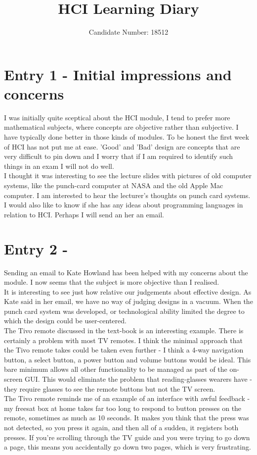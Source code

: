\documentclass{article}
\title{HCI Learning Diary}
\author{Candidate Number: 18512}
\begin{document}
\maketitle
\section*{Entry 1 - Initial impressions and concerns}

\noindent I was initially quite sceptical about the HCI module, I tend to prefer more mathematical subjects, where concepts are objective rather than subjective. I have typically done better in those kinds of modules. To be honest the first week of HCI has not put me at ease. 'Good' and 'Bad' design are concepts that are very difficult to pin down and I worry that if I am required to identify such things in an exam I will not do well.
\\\indent I thought it was interesting to see the lecture slides with pictures of old computer systems, like the punch-card computer at NASA and the old Apple Mac computer. I am interested to hear the lecturer's thoughts on punch card systems. I would also like to know if she has any ideas about programming languages in relation to HCI. Perhaps I will send an her an email.

\section*{Entry 2 - }

\noindent Sending an email to Kate Howland has been helped with my concerns about the module. I now seems that the subject is more objective than I realised.
\\\indent It is interesting to see just how relative our judgements about effective design. As Kate said in her email, we have no way of judging designs in a vacuum. When the punch card system was developed, or technological ability limited the degree to which the design could be user-centered.
\\\indent The Tivo remote discussed in the text-book is an interesting example. There is certainly a problem with most TV remotes. I think the minimal approach that the Tivo remote takes could be taken even further - I think a 4-way navigation button, a select button, a power button and volume buttons would be ideal. This bare minimum allows all other functionality to be managed as part of the on-screen GUI. This would eliminate the problem that reading-glasses wearers have - they require glasses to see the remote buttons but not the TV screen.
\\\indent The Tivo remote reminds me of an example of an interface with awful feedback - my freesat box at home takes far too long to respond to button presses on the remote, sometimes as much as 10 seconds. It makes you think that the press was not detected, so you press it again, and then all of a sudden, it registers both presses. If you're scrolling through the TV guide and you were trying to go down a page, this means you accidentally go down two pages, which is very frustrating.
\end{document}
